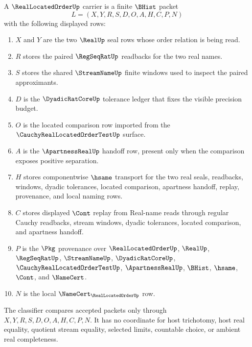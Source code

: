 \begin{definition}
\label{def:real-located-order-carrier}
A $\RealLocatedOrderUp$ carrier is a finite $\BHist$ packet
$$
L=(X,Y,R,S,D,O,A,H,C,P,N)
$$
with the following displayed rows:
\begin{enumerate}
\item $X$ and $Y$ are the two $\RealUp$ seal rows whose order relation is being read.
\item $R$ stores the paired $\RegSeqRatUp$ readbacks for the two real names.
\item $S$ stores the shared $\StreamNameUp$ finite windows used to inspect the paired approximants.
\item $D$ is the $\DyadicRatCoreUp$ tolerance ledger that fixes the visible precision budget.
\item $O$ is the located comparison row imported from the $\CauchyRealLocatedOrderTestUp$ surface.
\item $A$ is the $\ApartnessRealUp$ handoff row, present only when the comparison exposes positive separation.
\item $H$ stores componentwise $\hsame$ transport for the two real seals, readbacks, windows, dyadic tolerances, located comparison, apartness handoff, replay, provenance, and local naming rows.
\item $C$ stores displayed $\Cont$ replay from Real-name reads through regular Cauchy readbacks, stream windows, dyadic tolerances, located comparison, and apartness handoff.
\item $P$ is the $\Pkg$ provenance over $\RealLocatedOrderUp$, $\RealUp$, $\RegSeqRatUp$, $\StreamNameUp$, $\DyadicRatCoreUp$, $\CauchyRealLocatedOrderTestUp$, $\ApartnessRealUp$, $\BHist$, $\hsame$, $\Cont$, and $\NameCert$.
\item $N$ is the local $\NameCert_{\RealLocatedOrderUp}$ row.
\end{enumerate}
The classifier compares accepted packets only through $X,Y,R,S,D,O,A,H,C,P,N$. It has no coordinate for host trichotomy, host real equality, quotient stream equality, selected limits, countable choice, or ambient real completeness.
\end{definition}

